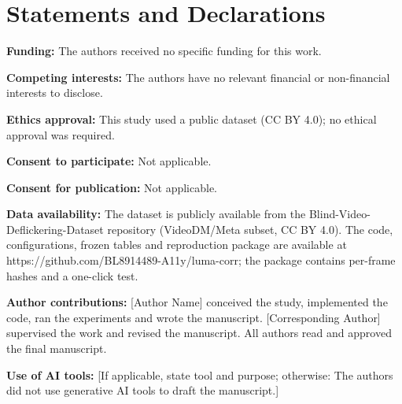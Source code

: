 \documentclass[twocolumn,10pt]{svjour3}
\begin{document}
\section*{Statements and Declarations}

\textbf{Funding:} The authors received no specific funding for this work.

\textbf{Competing interests:} The authors have no relevant financial or non-financial interests to disclose.

\textbf{Ethics approval:} This study used a public dataset (CC BY 4.0); no ethical approval was required.

\textbf{Consent to participate:} Not applicable.

\textbf{Consent for publication:} Not applicable.

\textbf{Data availability:} The dataset is publicly available from the Blind-Video-Deflickering-Dataset repository (VideoDM/Meta subset, CC BY 4.0). The code, configurations, frozen tables and reproduction package are available at https://github.com/BL8914489-A11y/luma-corr; the package contains per-frame hashes and a one-click test.

\textbf{Author contributions:} [Author Name] conceived the study, implemented the code, ran the experiments and wrote the manuscript. [Corresponding Author] supervised the work and revised the manuscript. All authors read and approved the final manuscript.

\textbf{Use of AI tools:} [If applicable, state tool and purpose; otherwise: The authors did not use generative AI tools to draft the manuscript.]
\end{document}

